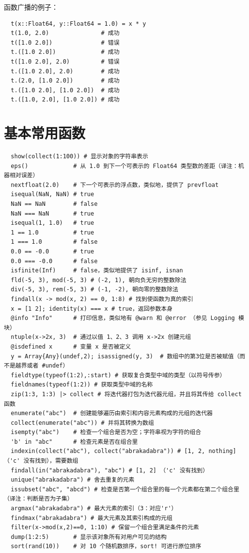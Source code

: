 \documentclass[10pt,a4paper]{article}
\begin{document}
函数广播的例子：
\begin{lstlisting}
  t(x::Float64, y::Float64 = 1.0) = x * y
  t(1.0, 2.0)               # 成功
  t([1.0 2.0])              # 错误
  t.([1.0 2.0])             # 成功
  t([1.0 2.0], 2.0)         # 错误
  t.([1.0 2.0], 2.0)        # 成功
  t.(2.0, [1.0 2.0])        # 成功
  t.([1.0 2.0], [1.0 2.0])  # 成功
  t.([1.0, 2.0], [1.0 2.0]) # 成功
\end{lstlisting}

\section{基本常用函数}
\begin{lstlisting}
  show(collect(1:100)) # 显示对象的字符串表示
  eps()             # 从 1.0 到下一个可表示的 Float64 类型数的差距（译注：机器相对误差）
  nextfloat(2.0)    # 下一个可表示的浮点数，类似地，提供了 prevfloat
  isequal(NaN, NaN) # true
  NaN == NaN        # false
  NaN === NaN       # true
  isequal(1, 1.0)   # true
  1 == 1.0          # true
  1 === 1.0         # false
  0.0 == -0.0       # true
  0.0 === -0.0      # false
  isfinite(Inf)     # false，类似地提供了 isinf, isnan
  fld(-5, 3), mod(-5, 3) # (-2, 1), 朝向负无穷的整数除法
  div(-5, 3), rem(-5, 3) # (-1, -2), 朝向零的整数除法
  findall(x -> mod(x, 2) == 0, 1:8) # 找到使函数为真的索引
  x = [1 2]; identity(x) === x # true，返回参数本身
  @info "Info"      # 打印信息，类似地有 @warn 和 @error （参见 Logging 模块）
  ntuple(x->2x, 3)  # 通过以值 1、2、3 调用 x->2x 创建元组
  @isdefined x      # 变量 x 是否被定义
  y = Array{Any}(undef,2); isassigned(y, 3)  # 数组中的第3位是否被赋值（而不是越界或者 #undef）
  fieldtype(typeof(1:2),:start) # 获取复合类型中域的类型（以符号传参）
  fieldnames(typeof(1:2)) # 获取类型中域的名称
  zip(1:3, 1:3) |> collect # 将迭代器打包为迭代器元组，并且将其传给 collect 函数
  enumerate("abc")  # 创建能够遍历由索引和内容元素构成的元组的迭代器
  collect(enumerate("abc")) # 并将其转换为数组
  isempty("abc")    # 检查一个组合是否为空；字符串视为字符的组合
  'b' in "abc"      # 检查元素是否在组合里
  indexin(collect("abc"), collect("abrakadabra")) # [1, 2, nothing] （'c' 没有找到），需要数组
  findall(in("abrakadabra"), "abc") # [1, 2] （'c' 没有找到）
  unique("abrakadabra") # 舍去重复的元素
  issubset("abc", "abcd") # 检查是否第一个组合里的每一个元素都在第二个组合里（译注：判断是否为子集）
  argmax("abrakadabra") # 最大元素的索引（3：对应'r'）
  findmax("abrakadabra") # 最大元素及其索引构成的元组
  filter(x->mod(x,2)==0, 1:10) # 保留一个组合里满足条件的元素
  dump(1:2:5)       # 显示该对象所有对用户可见的结构
  sort(rand(10))    # 对 10 个随机数排序，sort! 可进行原位排序
\end{lstlisting}
\end{document}

